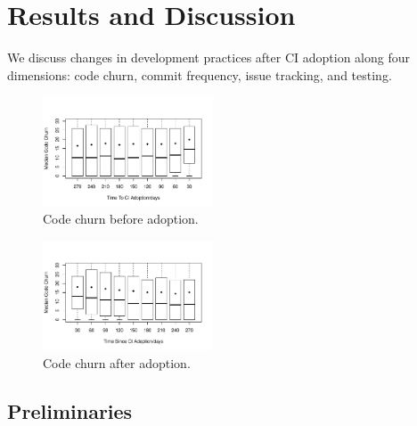 
\section{Results and Discussion}

We discuss changes in development practices after CI adoption along four 
dimensions: code churn, commit frequency, issue tracking, and testing. 

\begin{figure}[t]
\centering
\includegraphics[width=0.45\textwidth, clip=true, trim=0 15 15 10]{churn_before.pdf}
\caption{Code churn before \Tvis adoption.}
\label{Fig:CodeChurnBefore}
\end{figure}


\begin{figure}[t]
\centering
\includegraphics[width=0.45\textwidth, clip=true, trim=0 15 15 10]{churn_after.pdf}
\caption{Code churn after \Tvis adoption.}
\label{Fig:CodeChurnAfter}
\end{figure}


\subsection{Preliminaries}
\label{sec:examples}

